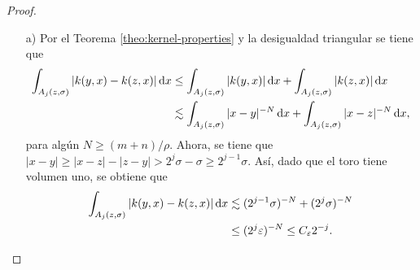 \begin{proof}
	\begin{itemize}
		\item[a)] Por el Teorema \ref{theo:kernel-properties} y la desigualdad triangular se tiene que 
		\begin{align*}
			\int_{A_j(z, \sigma)} |k(y, x) - k(z, x)|\mathop{}\!\mathrm{d} x  &\leq  \int_{A_j(z, \sigma)} |k(y, x)| \mathop{}\!\mathrm{d} x +\int_{A_j(z, \sigma)} |k(z, x)|\mathop{}\!\mathrm{d} x\\
			 & \lesssim \int_{A_j(z, \sigma)} |x-y|^{-N} \mathop{}\!\mathrm{d} x + \int_{A_j(z, \sigma)} |x-z|^{-N} \mathop{}\!\mathrm{d} x,
		\end{align*}
		para algún $N\geq (m+n)/\rho$. Ahora, se tiene que $|x-y| \geq |x-z| - |z-y|>2^j\sigma -\sigma \geq 2^{j-1}\sigma$. Así, dado que el toro tiene volumen uno, se obtiene que 
		\begin{align*}
			\int_{A_j(z, \sigma)} |k(y, x) - k(z, x)|\mathop{}\!\mathrm{d} x  & \lesssim (2^{j-1}\sigma)^{-N}  +  (2^{j}\sigma)^{-N}  \\
			 & \leq (2^{j} \varepsilon)^{-N} \leq C_\varepsilon 2^{-j}.
		\end{align*}
		

\end{itemize}
\end{proof}
